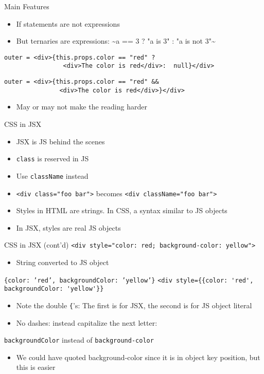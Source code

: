 \documentclass[presentation]{beamer}
\begin{document}
\begin{frame}[fragile,label=sec-9]{Main Features}
 \begin{itemize}
\item If statements are not expressions
\item But ternaries are expressions: \textasciitilde{}a == 3 ? "a is 3" : "a is not 3"\textasciitilde{}
\end{itemize}

\begin{verbatim}
outer = <div>{this.props.color == "red" ?
                <div>The color is red</div>:  null}</div>
\end{verbatim}

\begin{verbatim}
outer = <div>{this.props.color == "red" &&
               <div>The color is red</div>}</div>
\end{verbatim}

\begin{itemize}
\item May or may not make the reading harder
\end{itemize}
\end{frame}

\begin{frame}[fragile,label=sec-10]{CSS in JSX}
 \begin{itemize}
\item JSX is JS behind the scenes
\item \texttt{class} is reserved in JS
\item Use \texttt{className} instead
\item \verb~<div class="foo bar">~ becomes \verb~<div className="foo bar">~
\item Styles in HTML are strings. In CSS, a syntax similar to
JS objects
\item In JSX, styles are real JS objects
\end{itemize}
\end{frame}

\begin{frame}[fragile,label=sec-11]{CSS in JSX (cont'd)}
 \verb~<div style="color: red; background-color: yellow">~
\begin{itemize}
\item String converted to JS object
\end{itemize}
\texttt{\{color: 'red', backgroundColor: 'yellow'\}}
\verb~<div style={{color: 'red', backgroundColor: 'yellow'}}~
\begin{itemize}
\item Note the double \texttt{\{}'s: The first is for JSX, the second is for JS object
literal
\item No dashes: instead capitalize the next letter:
\end{itemize}
\texttt{backgroundColor} instead of \texttt{background-color}
\begin{itemize}
\item We could have quoted background-color since it is in object key position,
but this is easier
\end{itemize}
\end{frame}
\end{document}
